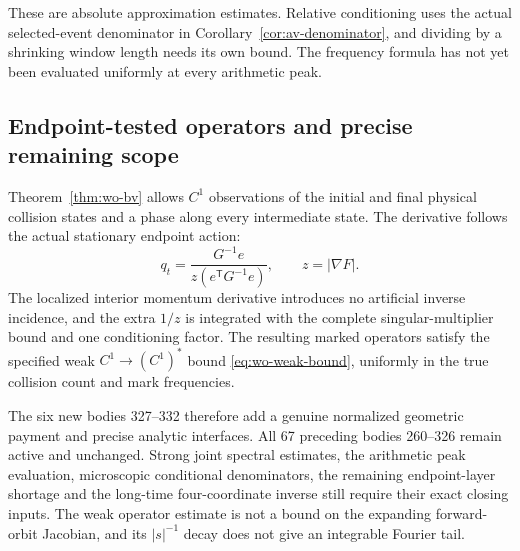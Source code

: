 These are absolute approximation estimates. Relative conditioning
uses the actual selected-event denominator in
Corollary~\ref{cor:av-denominator}, and dividing by a shrinking
window length needs its own bound. The frequency formula has
not yet been evaluated uniformly at every arithmetic peak.

\subsection*{Endpoint-tested operators and precise remaining scope}
Theorem~\ref{thm:wo-bv} allows $C^1$ observations of the initial
and final physical collision states and a phase along every
intermediate state. The derivative follows the actual stationary
endpoint action:
\[
 q_t=\frac{G^{-1}e}{z(e^{\mathsf T}G^{-1}e)},\qquad z=|\nabla F|.
\]
The localized interior momentum derivative introduces no artificial
inverse incidence, and the extra $1/z$ is integrated with the
complete singular-multiplier bound and one conditioning factor.
The resulting marked operators satisfy the specified weak
$C^1\to(C^1)^*$ bound \eqref{eq:wo-weak-bound}, uniformly in
the true collision count and mark frequencies.

The six new bodies 327--332 therefore add a genuine normalized
geometric payment and precise analytic interfaces. All 67
preceding bodies 260--326 remain active and unchanged. Strong
joint spectral estimates, the arithmetic peak evaluation,
microscopic conditional denominators, the remaining endpoint-layer
shortage and the long-time four-coordinate inverse still require
their exact closing inputs. The weak operator estimate is not a
bound on the expanding forward-orbit Jacobian, and its
$|s|^{-1}$ decay does not give an integrable Fourier tail.
